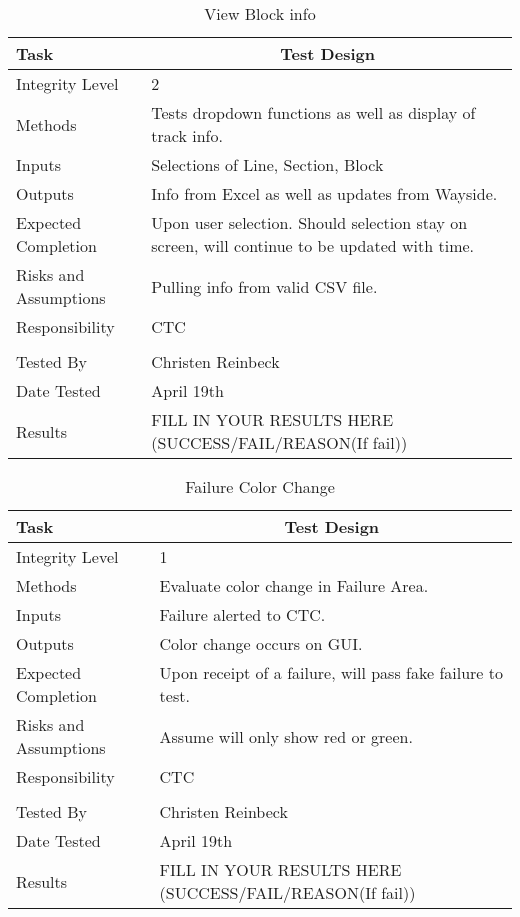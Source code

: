 \documentclass[]{article}
\begin{document}
\begin{table}[H]
	\centering
	\caption{View Block info}
	\begin{tabular}{|l|l|}
		\hline
		Task & \multicolumn{1}{c|}{Test Design} \\ \hline
		Integrity Level & 2 \\ \hline
		Methods & Tests dropdown functions as well as display of track info.\\ \hline
		Inputs &  Selections of Line, Section, Block \\ \hline
		Outputs &  Info from Excel as well as updates from Wayside.\\ \hline
		Expected Completion & \parbox[t]{10cm}{Upon user selection. Should selection stay on screen, will continue to be updated with time.}\\ \hline
		Risks and Assumptions & \parbox[t]{10cm}{Pulling info from valid CSV file.} \\ \hline
		Responsibility & CTC\\ \hline
		\\ \hline
		Tested By   &  Christen Reinbeck\\	\hline
		Date Tested & \parbox[t]{10cm}{April 19th}\\ \hline
		Results & FILL IN YOUR RESULTS HERE (SUCCESS/FAIL/REASON(If fail))\\ \hline
	\end{tabular}
\end{table}

\begin{table}[H]
	\centering
	\caption{Failure Color Change}
	\begin{tabular}{|l|l|}
		\hline
		Task & \multicolumn{1}{c|}{Test Design} \\ \hline
		Integrity Level & 1 \\ \hline
		Methods & Evaluate color change in Failure Area.\\ \hline
		Inputs &  Failure alerted to CTC. \\ \hline
		Outputs &  Color change occurs on GUI. \\ \hline
		Expected Completion & \parbox[t]{10cm}{Upon receipt of a failure, will pass fake failure to test.}\\ \hline
		Risks and Assumptions & \parbox[t]{10cm}{Assume will only show red or green.} \\ \hline
		Responsibility & CTC\\ \hline
		\\ \hline
		Tested By   &  Christen Reinbeck\\	\hline
		Date Tested & \parbox[t]{10cm}{April 19th}\\ \hline
		Results & FILL IN YOUR RESULTS HERE (SUCCESS/FAIL/REASON(If fail))\\ \hline
	\end{tabular}
\end{table}
\end{document}
